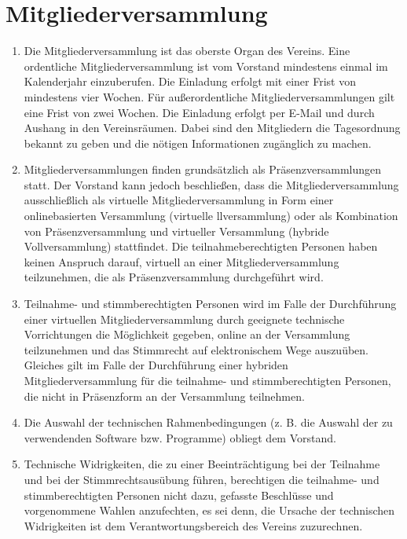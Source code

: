 \documentclass[12pt]{article}
\begin{document}
\section{Mitgliederversammlung}
\begin{enumerate}[label=(\arabic*)]
	\item Die Mitgliederversammlung ist das oberste Organ des Vereins. Eine ordentliche
	      Mitgliederversammlung ist vom Vorstand mindestens einmal im Kalenderjahr einzuberufen. Die
	      Einladung erfolgt mit einer Frist von mindestens vier Wochen. Für außerordentliche
	      Mitgliederversammlungen gilt eine Frist von zwei Wochen. Die Einladung erfolgt per E-Mail und durch
	      Aushang in den Vereinsräumen. Dabei sind den Mitgliedern die Tagesordnung bekannt zu geben und
	      die nötigen Informationen zugänglich zu machen.
	\item Mitgliederversammlungen finden grundsätzlich als Präsenzversammlungen statt.
	      Der Vorstand kann jedoch beschließen, dass die Mitgliederversammlung ausschließlich als virtuelle
	      Mitgliederversammlung in Form einer onlinebasierten Versammlung (virtuelle llversammlung) oder als
	      Kombination von Präsenzversammlung und virtueller Versammlung (hybride Vollversammlung)
	      stattfindet. Die teilnahmeberechtigten Personen haben keinen Anspruch darauf, virtuell an einer
	      Mitgliederversammlung teilzunehmen, die als Präsenzversammlung durchgeführt wird.
	\item Teilnahme- und stimmberechtigten Personen wird im Falle der Durchführung einer virtuellen
	      Mitgliederversammlung durch geeignete technische Vorrichtungen die Möglichkeit gegeben, online
	      an der Versammlung teilzunehmen und das Stimmrecht auf elektronischem Wege auszuüben.
	      Gleiches gilt im Falle der Durchführung einer hybriden Mitgliederversammlung für die teilnahme- und
	      stimmberechtigten Personen, die nicht in Präsenzform an der Versammlung teilnehmen.
	\item Die Auswahl der technischen Rahmenbedingungen (z. B. die Auswahl der zu verwendenden
	      Software bzw. Programme) obliegt dem Vorstand.
	\item Technische Widrigkeiten, die zu einer Beeinträchtigung bei der Teilnahme und bei der
	      Stimmrechtsausübung führen, berechtigen die teilnahme- und stimmberechtigten Personen nicht
	      dazu, gefasste Beschlüsse und vorgenommene Wahlen anzufechten, es sei denn, die Ursache der
	      technischen Widrigkeiten ist dem Verantwortungsbereich des Vereins zuzurechnen.

\end{enumerate}
\end{document}
